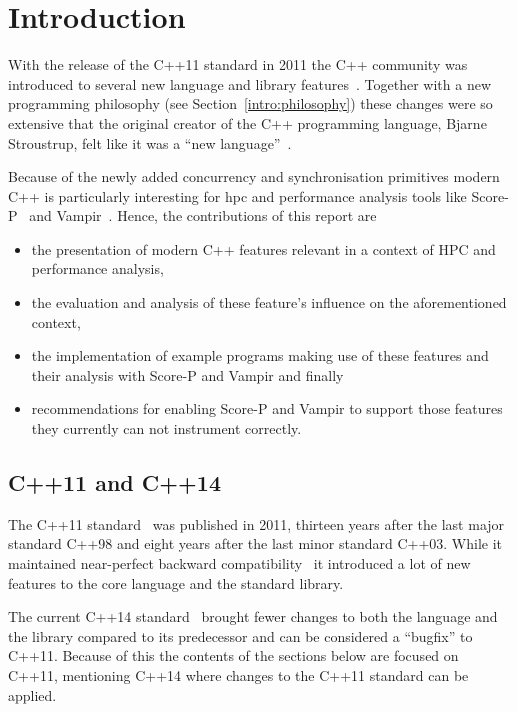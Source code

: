 \section{Introduction}\label{intro}

With the release of the C++11 standard in 2011 the C++ community was introduced to several new language and library features~\cite{cpp11std}. Together with a new programming philosophy (see Section~\ref{intro:philosophy}) these changes were so extensive that the original creator of the C++ programming language, Bjarne Stroustrup, felt like it was a ``new language''~\cite{tcpp}.

Because of the newly added concurrency and synchronisation primitives modern C++ is particularly interesting for \gls{hpc} and performance analysis tools like Score-P~\cite{scorep} and Vampir~\cite{vampir}. Hence, the contributions of this report are
\begin{itemize}
\item the presentation of modern C++ features relevant in a context of HPC and performance analysis,
\item the evaluation and analysis of these feature's influence on the aforementioned context,
\item the implementation of example programs making use of these features and their analysis with Score-P and Vampir and finally
\item recommendations for enabling Score-P and Vampir to support those features they currently can not instrument correctly.
\end{itemize}

\subsection{C++11 and C++14}\label{intro:cpp11_14}

The C++11 standard~\cite{cpp11std} was published in 2011, thirteen years after the last major standard C++98 and eight years after the last minor standard C++03. While it maintained near-perfect backward compatibility~\cite{cppfaq_learn} it introduced a lot of new features to the core language and the standard library.

The current C++14 standard~\cite{cpp14std} brought fewer changes to both the language and the library compared to its predecessor and can be considered a ``bugfix'' to C++11. Because of this the contents of the sections below are focused on C++11, mentioning C++14 where changes to the C++11 standard can be applied.


